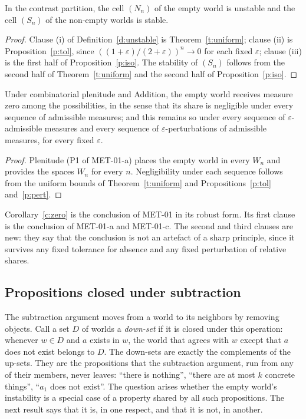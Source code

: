 \documentclass{situationist-preprint}
\begin{document}
\begin{theorem}\label{t:main}
In the contrast partition, the cell $(N_n)$ of the empty world is unstable and the cell $(S_n)$ of the non-empty worlds is stable.
\end{theorem}

\begin{proof}
Clause (i) of Definition~\ref{d:unstable} is Theorem~\ref{t:uniform}; clause (ii) is Proposition~\ref{p:tol}, since $((1+\varepsilon)/(2+\varepsilon))^n \to 0$ for each fixed $\varepsilon$; clause (iii) is the first half of Proposition~\ref{p:iso}. The stability of $(S_n)$ follows from the second half of Theorem~\ref{t:uniform} and the second half of Proposition~\ref{p:iso}.
\end{proof}

\begin{corollary}\label{c:zero}
Under combinatorial plenitude and Addition, the empty world receives measure zero among the possibilities, in the sense that its share is negligible under every sequence of admissible measures; and this remains so under every sequence of $\varepsilon$-admissible measures and every sequence of $\varepsilon$-perturbations of admissible measures, for every fixed $\varepsilon$.
\end{corollary}

\begin{proof}
Plenitude (P1 of MET-01-a) places the empty world in every $W_n$ and provides the spaces $W_n$ for every $n$. Negligibility under each sequence follows from the uniform bounds of Theorem~\ref{t:uniform} and Propositions~\ref{p:tol} and~\ref{p:pert}.
\end{proof}

Corollary~\ref{c:zero} is the conclusion of MET-01 in its robust form. Its first clause is the conclusion of MET-01-a and MET-01-c. The second and third clauses are new: they say that the conclusion is not an artefact of a sharp principle, since it survives any fixed tolerance for absence and any fixed perturbation of relative shares.

\subsection{Propositions closed under subtraction}

The subtraction argument moves from a world to its neighbors by removing objects. Call a set $D$ of worlds a \emph{down-set} if it is closed under this operation: whenever $w \in D$ and $a$ exists in $w$, the world that agrees with $w$ except that $a$ does not exist belongs to $D$. The down-sets are exactly the complements of the up-sets. They are the propositions that the subtraction argument, run from any of their members, never leaves: \enquote{there is nothing}, \enquote{there are at most $k$ concrete things}, \enquote{$a_1$ does not exist}. The question arises whether the empty world's instability is a special case of a property shared by all such propositions. The next result says that it is, in one respect, and that it is not, in another.
\end{document}
